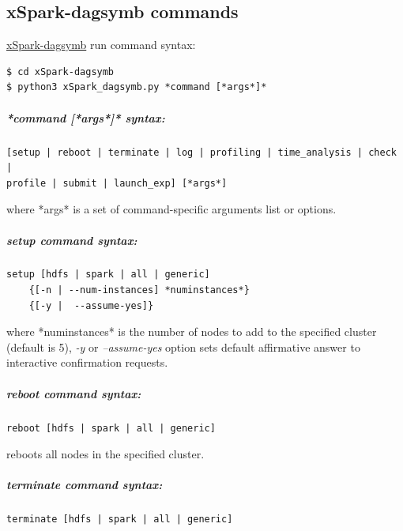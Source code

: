 \hypertarget{xspark-dagsymb-commands}{%
\subsection{xSpark-dagsymb commands}\label{xspark-dagsymb-commands}}

\href{https://github.com/gioenn/xSpark-dagsymb}{xSpark-dagsymb} run
command syntax:

\begin{verbatim}
$ cd xSpark-dagsymb
$ python3 xSpark_dagsymb.py *command [*args*]*
\end{verbatim}

\hypertarget{command-args-syntax}{%
\subparagraph{*command {[}*args*{]}*
	syntax:}\label{command-args-syntax}}

\begin{verbatim}
[setup | reboot | terminate | log | profiling | time_analysis | check | 
profile | submit | launch_exp] [*args*]
\end{verbatim}

where *args* is a set of command-specific arguments list or options.

\hypertarget{setup-command-syntax}{%
\subparagraph{\texorpdfstring{\emph{setup} command
		syntax:}{setup command syntax:}}\label{setup-command-syntax}}

\begin{verbatim}
setup [hdfs | spark | all | generic] 
    {[-n | --num-instances] *numinstances*} 
    {[-y |  --assume-yes]}
\end{verbatim}

where *numinstances* is the number of nodes to add to the specified
cluster (default is 5), \emph{-y} or \emph{--assume-yes} option sets
default affirmative answer to interactive confirmation requests.

\hypertarget{reboot-command-syntax}{%
\subparagraph{\texorpdfstring{\emph{reboot} command
		syntax:}{reboot command syntax:}}\label{reboot-command-syntax}}

\begin{verbatim}
reboot [hdfs | spark | all | generic]
\end{verbatim}

reboots all nodes in the specified cluster.

\hypertarget{terminate-command-syntax}{%
\subparagraph{\texorpdfstring{\emph{terminate} command
		syntax:}{terminate command syntax:}}\label{terminate-command-syntax}}

\begin{verbatim}
terminate [hdfs | spark | all | generic]
\end{verbatim}

